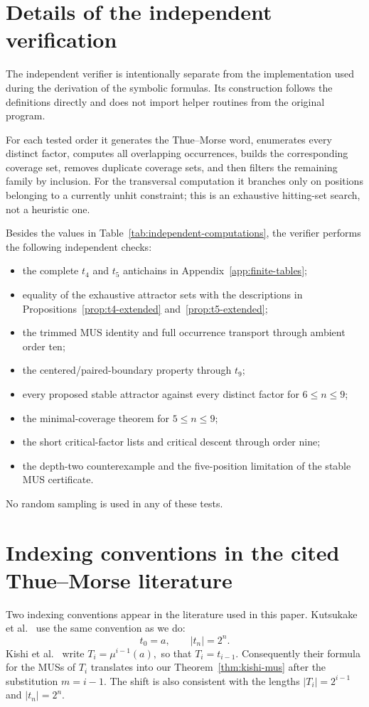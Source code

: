 \section{Details of the independent verification}
\label{app:independent-verification}

The independent verifier is intentionally separate from the implementation used during the derivation of the symbolic formulas.  Its construction follows the definitions directly and does not import helper routines from the original program.

For each tested order it generates the Thue--Morse word, enumerates every distinct factor, computes all overlapping occurrences, builds the corresponding coverage set, removes duplicate coverage sets, and then filters the remaining family by inclusion.  For the transversal computation it branches only on positions belonging to a currently unhit constraint; this is an exhaustive hitting-set search, not a heuristic one.

Besides the values in Table~\ref{tab:independent-computations}, the verifier performs the following independent checks:
\begin{itemize}
\item the complete $t_4$ and $t_5$ antichains in Appendix~\ref{app:finite-tables};
\item equality of the exhaustive attractor sets with the descriptions in Propositions~\ref{prop:t4-extended} and~\ref{prop:t5-extended};
\item the trimmed MUS identity and full occurrence transport through ambient order ten;
\item the centered/paired-boundary property through $t_9$;
\item every proposed stable attractor against every distinct factor for $6\le n\le9$;
\item the minimal-coverage theorem for $5\le n\le9$;
\item the short critical-factor lists and critical descent through order nine;
\item the depth-two counterexample and the five-position limitation of the stable MUS certificate.
\end{itemize}

No random sampling is used in any of these tests.


\section{Indexing conventions in the cited Thue--Morse literature}
\label{app:indexing}

Two indexing conventions appear in the literature used in this paper.  Kutsukake et al.~\cite{Kutsukake2020} use the same convention as we do:
\[
 t_0=a,
 \qquad
 |t_n|=2^n.
\]
Kishi et al.~\cite{Kishi2026} write
$
 T_i=\mu^{i-1}(a),
$
so that
$
 T_i=t_{i-1}.
$
Consequently their formula for the MUSs of $T_i$ translates into our Theorem~\ref{thm:kishi-mus} after the substitution $m=i-1$.  The shift is also consistent with the lengths $|T_i|=2^{i-1}$ and $|t_n|=2^n$.
